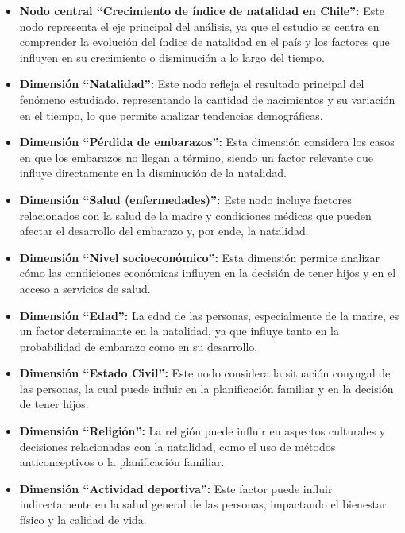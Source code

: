 \documentclass[runningheads]{llncs}
\begin{document}
\begin{itemize}

\item \textbf{Nodo central ``Crecimiento de índice de natalidad en Chile'':} Este nodo representa el eje principal del análisis, ya que el estudio se centra en comprender la evolución del índice de natalidad en el país y los factores que influyen en su crecimiento o disminución a lo largo del tiempo.

\item \textbf{Dimensión ``Natalidad'':} Este nodo refleja el resultado principal del fenómeno estudiado, representando la cantidad de nacimientos y su variación en el tiempo, lo que permite analizar tendencias demográficas.

\item \textbf{Dimensión ``Pérdida de embarazos'':} Esta dimensión considera los casos en que los embarazos no llegan a término, siendo un factor relevante que influye directamente en la disminución de la natalidad.

\item \textbf{Dimensión ``Salud (enfermedades)'':} Este nodo incluye factores relacionados con la salud de la madre y condiciones médicas que pueden afectar el desarrollo del embarazo y, por ende, la natalidad.

\item \textbf{Dimensión ``Nivel socioeconómico'':} Esta dimensión permite analizar cómo las condiciones económicas influyen en la decisión de tener hijos y en el acceso a servicios de salud.

\item \textbf{Dimensión ``Edad'':} La edad de las personas, especialmente de la madre, es un factor determinante en la natalidad, ya que influye tanto en la probabilidad de embarazo como en su desarrollo.

\item \textbf{Dimensión ``Estado Civil'':} Este nodo considera la situación conyugal de las personas, la cual puede influir en la planificación familiar y en la decisión de tener hijos.

\item \textbf{Dimensión ``Religión'':} La religión puede influir en aspectos culturales y decisiones relacionadas con la natalidad, como el uso de métodos anticonceptivos o la planificación familiar.

\item \textbf{Dimensión ``Actividad deportiva'':} Este factor puede influir indirectamente en la salud general de las personas, impactando el bienestar físico y la calidad de vida.


\end{itemize}
\end{document}
